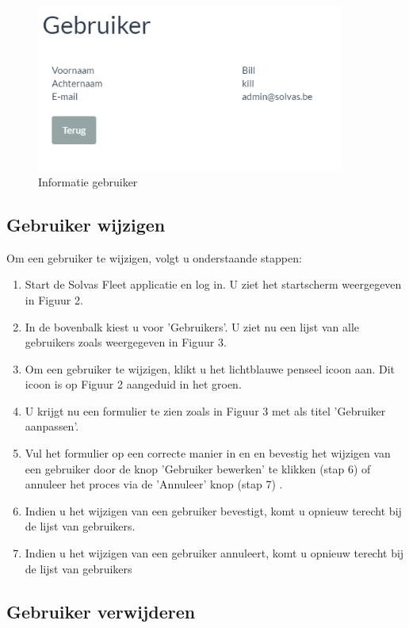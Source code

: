 \documentclass[11pt,openany]{article}
\begin{document}
\begin{figure}
	\centering
	\includegraphics[width=0.9\textwidth]{img/fig_e.png}
	\caption{Informatie gebruiker}
\end{figure}

\newpage
\subsection{Gebruiker wijzigen}

Om een gebruiker te wijzigen, volgt u onderstaande stappen:
\begin{enumerate}
	\item Start de Solvas Fleet applicatie en log in. U ziet het startscherm weergegeven in Figuur 2.
	\item In de bovenbalk kiest u voor 'Gebruikers'. U ziet nu een lijst van alle gebruikers zoals weergegeven in Figuur 3.
	\item Om een gebruiker te wijzigen, klikt u het lichtblauwe penseel icoon aan. Dit icoon is op Figuur 2 aangeduid in het groen.
	\item U krijgt nu een formulier te zien zoals in Figuur 3 met als titel 'Gebruiker aanpassen'.
	\item Vul het formulier op een correcte manier in en en bevestig het wijzigen van een gebruiker door de knop 'Gebruiker bewerken' te klikken (stap 6) of annuleer het proces via de 'Annuleer' knop (stap 7) .
	\item Indien u het wijzigen van een gebruiker bevestigt, komt u opnieuw terecht bij de lijst van gebruikers.
	\item Indien u het wijzigen van een gebruiker annuleert, komt u opnieuw terecht bij de lijst van gebruikers 
\end{enumerate}

\subsection{Gebruiker verwijderen}
\end{document}
